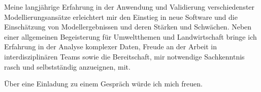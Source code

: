 \documentclass[11pt,a4paper,sans]{moderncv}        %
\begin{document}
Meine langj\"ahrige Erfahrung in der Anwendung und Validierung verschiedenster Modellierungsans\"atze erleichtert mir den Einstieg in neue Software und die Einsch\"atzung von Modellergebnissen und deren St\"arken und Schw\"achen. Neben einer allgemeinen Begeisterung f\"ur  Umweltthemen und Landwirtschaft bringe ich Erfahrung in der Analyse komplexer Daten, Freude an der Arbeit in interdisziplin\"aren Teams sowie  die Bereitschaft, mir notwendige Sachkenntnis rasch und selbstst\"andig anzueignen, mit.%

\"Uber eine Einladung zu einem Gespr\"ach w\"urde ich mich freuen.

\makeletterclosing
\clearpage


\nocite{*}

   
%
%
%
%
%
%
%
\end{document}
